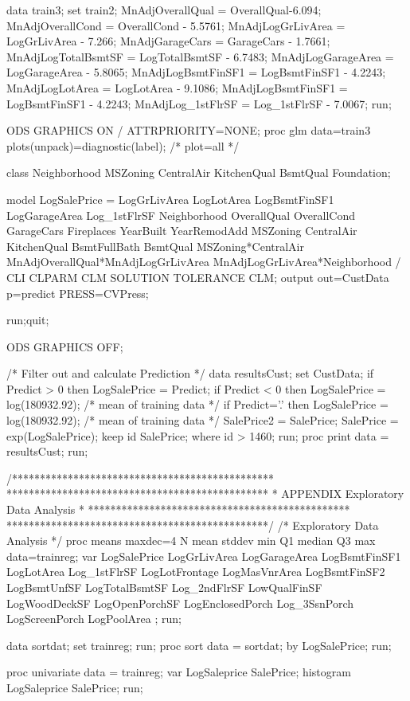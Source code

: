 data train3; set train2;
MnAdjOverallQual = OverallQual-6.094;
MnAdjOverallCond = OverallCond - 5.5761;
MnAdjLogGrLivArea = LogGrLivArea - 7.266;
MnAdjGarageCars = GarageCars - 1.7661;
MnAdjLogTotalBsmtSF = LogTotalBsmtSF - 6.7483;
MnAdjLogGarageArea = LogGarageArea - 5.8065;
MnAdjLogBsmtFinSF1 = LogBsmtFinSF1 - 4.2243;
MnAdjLogLotArea = LogLotArea - 9.1086;
MnAdjLogBsmtFinSF1 = LogBsmtFinSF1 - 4.2243;
MnAdjLog_1stFlrSF = Log_1stFlrSF - 7.0067;
run;

ODS GRAPHICS ON / ATTRPRIORITY=NONE; 
proc glm data=train3 plots(unpack)=diagnostic(label);  /* plot=all */  

class Neighborhood MSZoning CentralAir KitchenQual BsmtQual Foundation;

model LogSalePrice = LogGrLivArea LogLotArea LogBsmtFinSF1 LogGarageArea  
Log_1stFlrSF Neighborhood OverallQual OverallCond GarageCars Fireplaces YearBuilt 
YearRemodAdd MSZoning CentralAir KitchenQual BsmtFullBath BsmtQual 
MSZoning*CentralAir MnAdjOverallQual*MnAdjLogGrLivArea MnAdjLogGrLivArea*Neighborhood
/ CLI CLPARM CLM SOLUTION TOLERANCE CLM;
output out=CustData p=predict PRESS=CVPress;

run;quit;

ODS GRAPHICS OFF; 

/* Filter out and calculate Prediction */
data resultsCust;
	set CustData;
	if Predict > 0 then LogSalePrice = Predict;
	if Predict < 0 then LogSalePrice = log(180932.92); /* mean of training data */
	if Predict='.' then LogSalePrice = log(180932.92); /* mean of training data */
	SalePrice2 = SalePrice;
	SalePrice = exp(LogSalePrice);
	keep id SalePrice;
	where id > 1460;
run;
proc print data = resultsCust;
run;


/***********************************************
 ***********************************************
 *     APPENDIX Exploratory Data Analysis      *
 ***********************************************
 ***********************************************/
/* Exploratory Data Analysis */
proc means maxdec=4 N mean stddev min Q1 median Q3 max data=trainreg;
var LogSalePrice LogGrLivArea LogGarageArea LogBsmtFinSF1
    LogLotArea Log_1stFlrSF
	LogLotFrontage LogMasVnrArea LogBsmtFinSF2 
	LogBsmtUnfSF LogTotalBsmtSF Log_2ndFlrSF LowQualFinSF 
	LogWoodDeckSF LogOpenPorchSF LogEnclosedPorch Log_3SsnPorch 
	LogScreenPorch LogPoolArea ;
run;

data sortdat; set trainreg;
run;
proc sort data = sortdat;
   by LogSalePrice;
run; 

proc univariate data = trainreg; 
var LogSaleprice SalePrice;
histogram LogSaleprice SalePrice;
run; 

